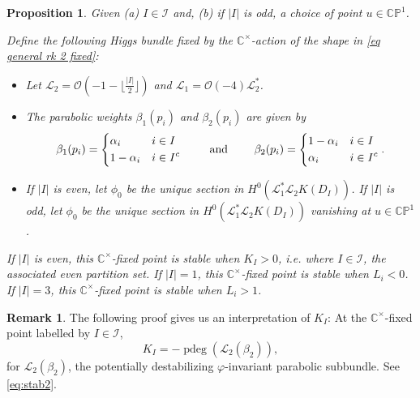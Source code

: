 \documentclass[12pt,letterpaper,reqno]{amsart}
\newtheorem{prop}[thm]{Proposition}
\theoremstyle{remark}
\theoremstyle{definition}
\newtheorem{rem}[thm]{Remark}
\numberwithin{thm}{section}
\numberwithin{equation}{section}
\numberwithin{figure}{section}
\newcommand{\cL}{\ensuremath{\mathcal L}}
\newcommand{\cO}{\ensuremath{\mathcal O}}
\newcommand{\C}{\ensuremath{\mathbb C}}
\newcommand{\CP}{\ensuremath{\mathbb {CP}}}
\DeclareMathOperator{\pdeg}{pdeg}
\begin{document}
\begin{prop}\label{prop:generalsplit}
Given (a) $I \in \mathcal{I}$ and, (b) if $|I|$ is odd, a choice of point $u \in \mathbb{CP}^1$. 

Define the following Higgs bundle fixed by the $\C^\times$-action of the shape in \eqref{eq general rk 2 fixed}:
\begin{itemize}
\item Let $\cL_2 = \cO(-1 - \lfloor \frac{|I|}{2} \rfloor)$ and $\cL_1 = \cO(-4)\cL_2^*$.
\item 
The parabolic weights $\beta_1(p_i)$ and $\beta_2(p_i)$ are given by 
\begin{equation}
        \label{eq fixedpoint weights}\beta_1(p_i)=\begin{dcases}
        \alpha_i & i \in I \\ 1-\alpha_i & i \in I^c
\end{dcases}\ \ \ \ \ \ \ \text{and}\ \ \ \ \ \ \ \beta_2(p_i)=\begin{dcases}
       1-\alpha_i & i \in I\\
       \alpha_i&i\in I^c
\end{dcases}.
\end{equation}
\item If $|I|$ is even, let $\phi_0$ be the unique section in $H^0(\cL_1^* \cL_2 K(D_I))$.  If $|I|$ is odd, let $\phi_0$ be the unique section in $H^0(\cL_1^* \cL_2 K(D_I))$ vanishing at $u \in \CP^1$.
\end{itemize}

If $|I|$ is even, this $\C^\times$-fixed point is stable when $K_I>0$, i.e. where $I \in \mathcal{I}$, the associated even partition set.
If $|I|=1$, this $\C^\times$-fixed point is stable when $L_i <0$. If $|I|=3$, this $\C^\times$-fixed point is stable when $L_i >1$.
\end{prop}
\begin{rem}
The following proof gives us an interpretation of $K_I$:
At the $\C^\times$-fixed point labelled by $I \in \mathcal{I}$,
\[ K_I = -\pdeg (\cL_2(\beta_2)),\]
for $\cL_2(\beta_2)$, the potentially destabilizing $\varphi$-invariant parabolic subbundle. See \eqref{eq:stab2}.
\end{rem}
\end{document}
